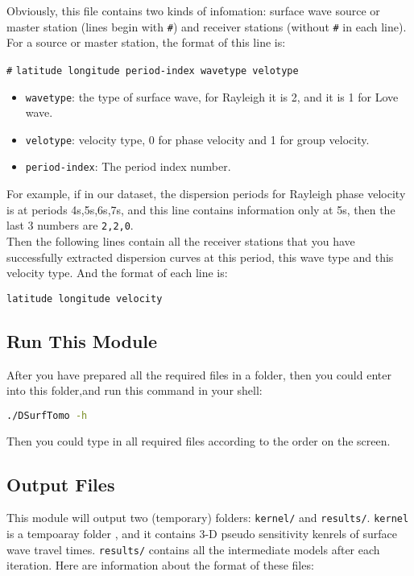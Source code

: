 \documentclass[UTF8]{article}
\begin{document}
Obviously, this file contains two kinds of infomation:
surface wave source or master station (lines begin with
\verb!#!) and receiver stations (without \verb!#! in each
line). For a source or master station, the format of 
this line is:\\
\begin{center}
    \verb!#! \texttt{latitude longitude period-index wavetype
     velotype}
\end{center}

\begin{itemize}
    \item \texttt{wavetype}: the type of surface wave, for 
                            Rayleigh it is 2, and it is 1 for Love wave.
    \item \texttt{velotype}: velocity type, 0 for phase velocity
                            and 1 for group velocity.
    \item \texttt{period-index}: The period index number.
\end{itemize}
For example, if in our dataset, the dispersion periods 
for Rayleigh phase velocity is at periods 4s,5s,6s,7s, 
and this line contains information only at 5s, then 
the last 3 numbers 
are \texttt{2,2,0}.\\

Then the following lines contain all the receiver stations
that you have successfully extracted dispersion curves
at this period, this wave type and this velocity type.
And the format of each line is:
\begin{center}
    \texttt{latitude longitude velocity}
\end{center} 


\subsection{Run This Module}
After you have prepared all the required files in a folder,
then you could enter into this folder,and run this command
in your shell:
\begin{lstlisting}[language=bash]
./DSurfTomo -h
\end{lstlisting}
Then you could type in all required files according to the 
order on the screen.

\subsection{Output Files}\label{surface wave output files}
This module will output two (temporary) folders: \verb!kernel/! 
and \verb!results/!. \texttt{kernel} is a tempoaray folder ,
and it contains 3-D pseudo sensitivity kenrels of surface wave
travel times. \verb!results/! contains all the intermediate models 
after each iteration. Here are information about the format
of these files:
\end{document}
